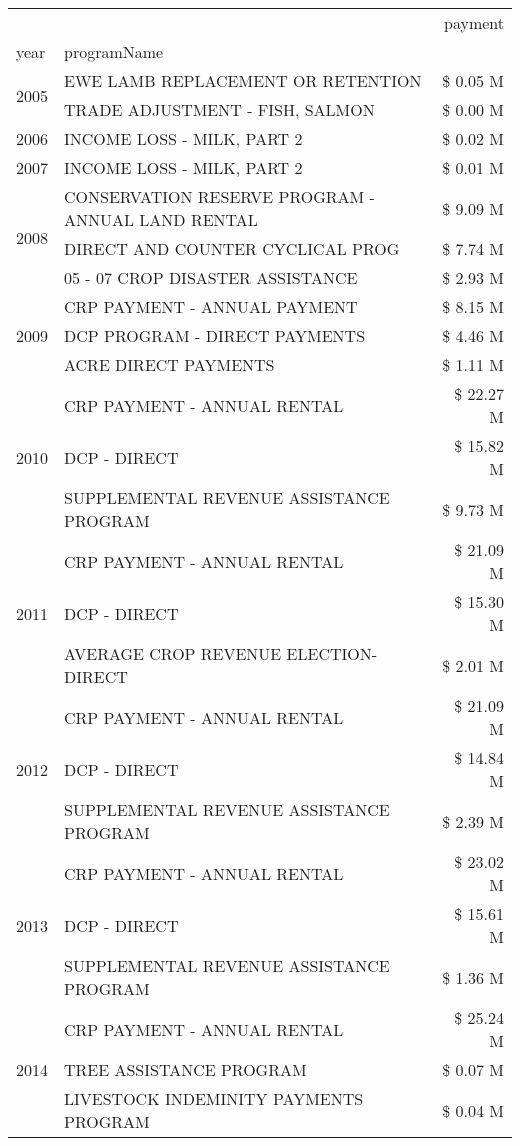 \begin{tabular}{llr}
\toprule
 &  & payment \\
year & programName &  \\
\midrule
\multirow[t]{2}{*}{2005} & EWE LAMB REPLACEMENT OR RETENTION & \$ 0.05 M \\
 & TRADE ADJUSTMENT - FISH, SALMON & \$ 0.00 M \\
\cline{1-3}
2006 & INCOME LOSS - MILK, PART 2 & \$ 0.02 M \\
\cline{1-3}
2007 & INCOME LOSS - MILK, PART 2 & \$ 0.01 M \\
\cline{1-3}
\multirow[t]{3}{*}{2008} & CONSERVATION RESERVE PROGRAM - ANNUAL LAND RENTAL & \$ 9.09 M \\
 & DIRECT AND COUNTER CYCLICAL PROG & \$ 7.74 M \\
 & 05 - 07 CROP DISASTER ASSISTANCE & \$ 2.93 M \\
\cline{1-3}
\multirow[t]{3}{*}{2009} & CRP PAYMENT - ANNUAL PAYMENT & \$ 8.15 M \\
 & DCP PROGRAM - DIRECT PAYMENTS & \$ 4.46 M \\
 & ACRE DIRECT PAYMENTS & \$ 1.11 M \\
\cline{1-3}
\multirow[t]{3}{*}{2010} & CRP PAYMENT - ANNUAL RENTAL & \$ 22.27 M \\
 & DCP - DIRECT & \$ 15.82 M \\
 & SUPPLEMENTAL REVENUE ASSISTANCE PROGRAM & \$ 9.73 M \\
\cline{1-3}
\multirow[t]{3}{*}{2011} & CRP PAYMENT - ANNUAL RENTAL & \$ 21.09 M \\
 & DCP - DIRECT & \$ 15.30 M \\
 & AVERAGE CROP REVENUE ELECTION-DIRECT & \$ 2.01 M \\
\cline{1-3}
\multirow[t]{3}{*}{2012} & CRP PAYMENT - ANNUAL RENTAL & \$ 21.09 M \\
 & DCP - DIRECT & \$ 14.84 M \\
 & SUPPLEMENTAL REVENUE ASSISTANCE PROGRAM & \$ 2.39 M \\
\cline{1-3}
\multirow[t]{3}{*}{2013} & CRP PAYMENT - ANNUAL RENTAL & \$ 23.02 M \\
 & DCP - DIRECT & \$ 15.61 M \\
 & SUPPLEMENTAL REVENUE ASSISTANCE PROGRAM & \$ 1.36 M \\
\cline{1-3}
\multirow[t]{3}{*}{2014} & CRP PAYMENT - ANNUAL RENTAL & \$ 25.24 M \\
 & TREE ASSISTANCE PROGRAM & \$ 0.07 M \\
 & LIVESTOCK INDEMINITY PAYMENTS PROGRAM & \$ 0.04 M \\

\end{tabular}
